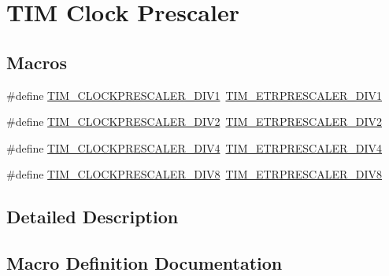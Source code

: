\hypertarget{group___t_i_m___clock___prescaler}{}\section{T\+IM Clock Prescaler}
\label{group___t_i_m___clock___prescaler}
\subsection*{Macros}
\begin{DoxyCompactItemize}
\item 
\#define \mbox{\hyperlink{group___t_i_m___clock___prescaler_ga3462b444a059f001c6df33f55c756313}{T\+I\+M\+\_\+\+C\+L\+O\+C\+K\+P\+R\+E\+S\+C\+A\+L\+E\+R\+\_\+\+D\+I\+V1}}~\mbox{\hyperlink{group___t_i_m___e_t_r___prescaler_gabead5364c62645592e42545ba09ab88a}{T\+I\+M\+\_\+\+E\+T\+R\+P\+R\+E\+S\+C\+A\+L\+E\+R\+\_\+\+D\+I\+V1}}
\item 
\#define \mbox{\hyperlink{group___t_i_m___clock___prescaler_gac6457751c882644727982fda1fd029a5}{T\+I\+M\+\_\+\+C\+L\+O\+C\+K\+P\+R\+E\+S\+C\+A\+L\+E\+R\+\_\+\+D\+I\+V2}}~\mbox{\hyperlink{group___t_i_m___e_t_r___prescaler_gaf7fe49f67bdb6b33b9b41953fee75680}{T\+I\+M\+\_\+\+E\+T\+R\+P\+R\+E\+S\+C\+A\+L\+E\+R\+\_\+\+D\+I\+V2}}
\item 
\#define \mbox{\hyperlink{group___t_i_m___clock___prescaler_ga11ce3686a0ee934384d0e4651823883d}{T\+I\+M\+\_\+\+C\+L\+O\+C\+K\+P\+R\+E\+S\+C\+A\+L\+E\+R\+\_\+\+D\+I\+V4}}~\mbox{\hyperlink{group___t_i_m___e_t_r___prescaler_gaa09da30c3cd28f1fe6b6f3f599a5212c}{T\+I\+M\+\_\+\+E\+T\+R\+P\+R\+E\+S\+C\+A\+L\+E\+R\+\_\+\+D\+I\+V4}}
\item 
\#define \mbox{\hyperlink{group___t_i_m___clock___prescaler_ga86f147be5654631b21aa391a001401d5}{T\+I\+M\+\_\+\+C\+L\+O\+C\+K\+P\+R\+E\+S\+C\+A\+L\+E\+R\+\_\+\+D\+I\+V8}}~\mbox{\hyperlink{group___t_i_m___e_t_r___prescaler_ga834e38200874cced108379b17a24d0b7}{T\+I\+M\+\_\+\+E\+T\+R\+P\+R\+E\+S\+C\+A\+L\+E\+R\+\_\+\+D\+I\+V8}}
\end{DoxyCompactItemize}


\subsection{Detailed Description}


\subsection{Macro Definition Documentation}
\mbox{\label{group___t_i_m___clock___prescaler_ga3462b444a059f001c6df33f55c756313}} 

